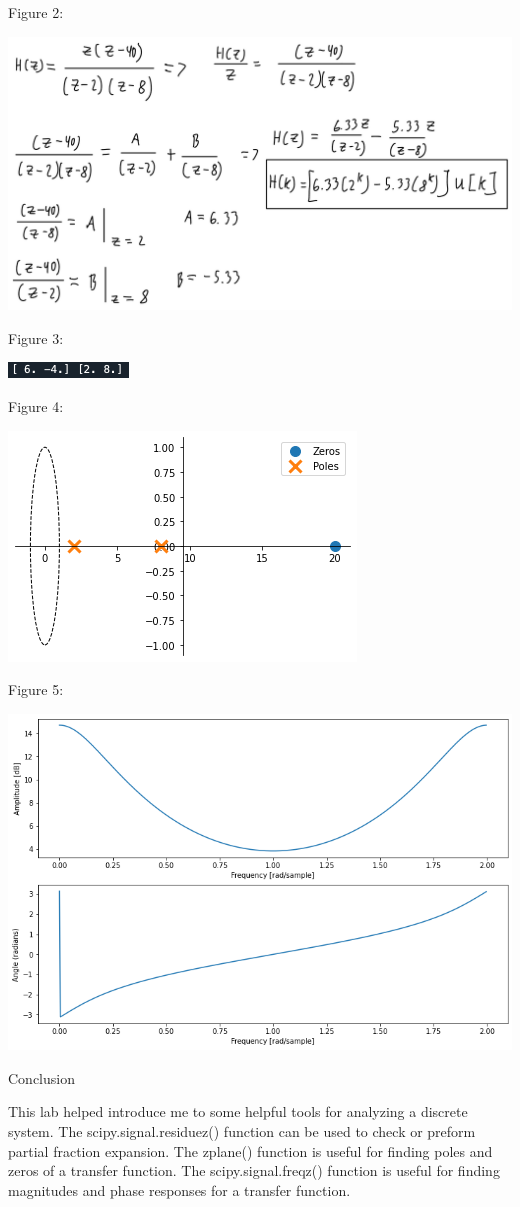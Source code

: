 \documentclass[nobib]{MSword}
\begin{document}
Figure 2:

\includegraphics[scale = 0.2]
{txt/Lab11Fig2.jpeg}


Figure 3:

\includegraphics[scale = 1]
{txt/Lab11Fig3.png}

Figure 4:

\includegraphics[scale = 0.9]
{txt/Lab11Fig4.png}

Figure 5:

\includegraphics[scale = 0.6]
{txt/Lab11Fig5.png}

\begin{center}
    Conclusion
\end{center}
This lab helped introduce me to some helpful tools for analyzing a discrete system. The scipy.signal.residuez() function can be used to check or preform partial fraction expansion. The zplane() function is useful for finding poles and zeros of a transfer function. The scipy.signal.freqz() function is useful for finding magnitudes and phase responses for a transfer function. 
\end{document}
